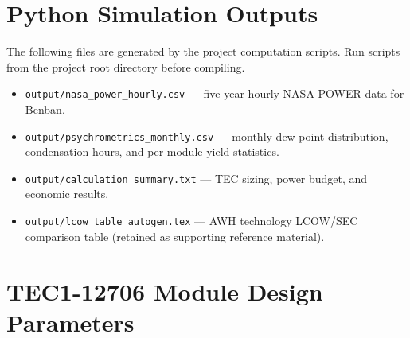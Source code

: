 \documentclass[12pt,a4paper]{report}
\numberwithin{equation}{chapter}
\numberwithin{figure}{chapter}
\numberwithin{table}{chapter}
\begin{document}



\appendix

\chapter{Python Simulation Outputs}
\label{app:python}

The following files are generated by the project computation scripts. Run scripts from
the project root directory before compiling.

\begin{itemize}[leftmargin=*]
  \item \texttt{output/nasa\_power\_hourly.csv} --- five-year hourly NASA POWER data
        for Benban.
  \item \texttt{output/psychrometrics\_monthly.csv} --- monthly dew-point distribution,
        condensation hours, and per-module yield statistics.
  \item \texttt{output/calculation\_summary.txt} --- TEC sizing, power budget, and
        economic results.
  \item \texttt{output/lcow\_table\_autogen.tex} --- AWH technology LCOW/SEC
        comparison table (retained as supporting reference material).
\end{itemize}

\chapter{TEC1-12706 Module Design Parameters}
\label{app:tec}
\end{document}
